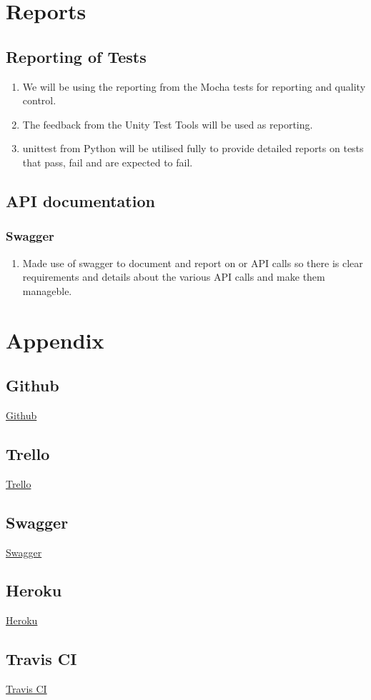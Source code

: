 \documentclass{article}
\begin{document}
\section{Reports}
   	\subsection{Reporting of Tests}
		\begin{enumerate}
			\item We will be using the reporting from the Mocha tests for reporting and quality control.
			\item The feedback from the Unity Test Tools will be used as reporting.
			\item unittest from Python will be utilised fully to provide detailed reports on tests that pass, fail and are expected to fail.
		\end{enumerate}

	\subsection{API documentation}
		\subsubsection{Swagger}
			\begin{enumerate}
				\item Made use of swagger to document and report on or API calls so there is clear requirements and details about the various API calls and make them manageble.
			\end{enumerate}
  
\section{Appendix}
	\subsection{Github}
		\href{https://github.com/KobusMarais/Cerebero}{Github}
	\subsection{Trello}
		\href{https://trello.com/b/WXh8cJZQ/demo-2}{Trello}
	\subsection{Swagger}
		\href{https://app.swaggerhub.com/apis/KobusMarais/eCivixAPI/1.0.0}{Swagger}
	\subsection{Heroku}
		\href{https://dashboard.heroku.com/apps/ecivix-testing}{Heroku}
	\subsection{Travis CI}
		\href{https://travis-ci.org/KobusMarais/Cerebero/}{Travis CI}
\end{document}
